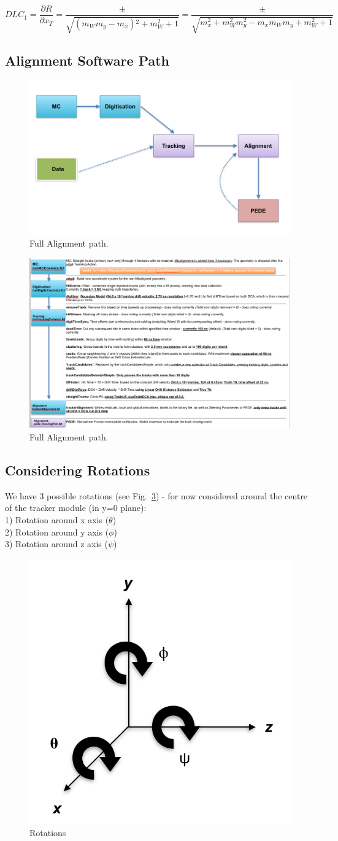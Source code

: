 \documentclass[a4paper,11pt]{article}
\begin{document}
\begin{equation}
DLC_1 = \frac{\partial R}{\partial x_T} =   \frac{\pm}{\sqrt{\left(m_W m_y-m_x\right){}^2+m_W^2+1}} = \frac{\pm}{\sqrt{m_x^2 + m_W^2 m_y^2 - m_x m_W m_y + m_W^2 + 1}} 
\end{equation}

\subsection{Alignment Software Path}

\begin{figure}[!ht]
\centering
\includegraphics[width=0.4\linewidth]{fig/AlignPath.png}
\caption{Full Alignment path.}
\label{fig:AlignPath}
\end{figure}

\begin{figure}[!ht]
\centering
\includegraphics[width=0.4\linewidth]{fig/AlignPath2.png}
\caption{Full Alignment path.}
\label{fig:AlignPath}
\end{figure}

\clearpage
\subsection{Considering Rotations}

We have 3 possible rotations (see Fig.~\ref{fig:Rotation}) - for now considered around the centre of the tracker module (in y=0 plane): \\
1) Rotation around x axis ($\theta$) \\
2) Rotation around y axis ($\phi$) \\
3) Rotation around z axis ($\psi$) \\

\begin{figure}[!ht]
\centering
\includegraphics[width=0.4\linewidth]{fig/rotAxis.png}
\caption{Rotations}
\label{fig:Rotation}
\end{figure}
\end{document}
